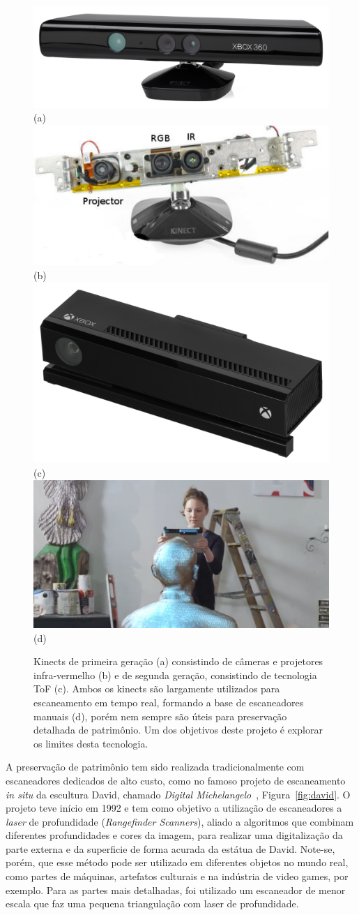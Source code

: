 \begin{figure} [!h]
	\centering
	\includegraphics[width=0.45\linewidth]{figs/Xbox-360-Kinect-Standalone.png}(a)
	\includegraphics[width=0.45\linewidth]{figs/kinect-internals.pdf}(b)
 	\includegraphics[width=0.45\linewidth]{figs/Xbox-One-Kinect.jpg}(c)
 	\includegraphics[width=0.45\linewidth]{figs/kinect-handheld1.png} (d)
	\caption{%
   Kinects de primeira geração (a) consistindo de câmeras e projetores
   infra-vermelho (b) e de segunda geração, consistindo de tecnologia ToF (c). 
   Ambos os kinects são largamente utilizados para escaneamento em tempo real, 
   formando a base de escaneadores manuais (d), porém nem sempre são úteis para 
   preservação detalhada de patrimônio. Um dos objetivos deste
   projeto é explorar os limites desta tecnologia.
	}\label{fig:kinect}
\end{figure}

A preservação de patrimônio tem sido realizada tradicionalmente com escaneadores
dedicados de alto custo, como no famoso projeto de escaneamento \emph{in situ} da escultura
David, chamado \emph{Digital Michelangelo}~\cite{levoy2000digital},
Figura~\ref{fig:david}.  O projeto teve início em 1992 e tem como objetivo a
utilização de escaneadores a \emph{laser} de profundidade (\emph{Rangefinder Scanners}),
aliado a algoritmos que combinam diferentes profundidades e cores da imagem,
para realizar uma digitalização da parte externa e da superficie de forma
acurada da estátua de David. Note-se, porém, que esse método pode ser utilizado em diferentes
objetos no mundo real, como partes de máquinas, artefatos culturais e na
indústria de video games, por exemplo.  Para as partes mais detalhadas, foi
utilizado um escaneador de menor escala que faz uma pequena triangulação com
laser de profundidade.

